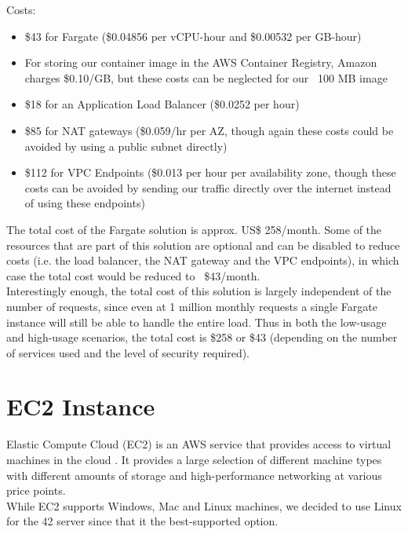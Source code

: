 Costs:
\begin{itemize}
\item \$43 for Fargate (\$0.04856 per vCPU-hour and \$0.00532 per GB-hour)
\item For storing our container image in the AWS Container Registry, Amazon charges \$0.10/GB, but these costs can be neglected for our ~100 MB image
\item \$18 for an Application Load Balancer (\$0.0252 per hour)
\item \$85 for NAT gateways (\$0.059/hr per AZ, though again these costs could be avoided by using a public subnet directly)
\item \$112 for VPC Endpoints (\$0.013 per hour per availability zone, though these costs can be avoided by sending our traffic directly over the internet instead of using these endpoints)
\end{itemize}

The total cost of the Fargate solution is approx. US\$ 258/month. Some of the resources that are part of this solution are optional and can be disabled to reduce costs (i.e. the load balancer, the NAT gateway and the VPC endpoints), in which case the total cost would be reduced to ~\$43/month.
\\[12pt]
Interestingly enough, the total cost of this solution is largely independent of the number of requests, since even at 1 million monthly requests a single Fargate instance will still be able to handle the entire load. Thus in both the low-usage and high-usage scenarios, the total cost is \$258 or \$43 (depending on the number of services used and the level of security required).

\section{EC2 Instance}

Elastic Compute Cloud (EC2) is an AWS service that provides access to virtual machines in the cloud \cite{amazon-2022C}. It provides a large selection of different machine types with different amounts of storage and high-performance networking at various price points.
\\[12pt]
While EC2 supports Windows, Mac and Linux machines, we decided to use Linux for the 42 server since that it the best-supported option.


